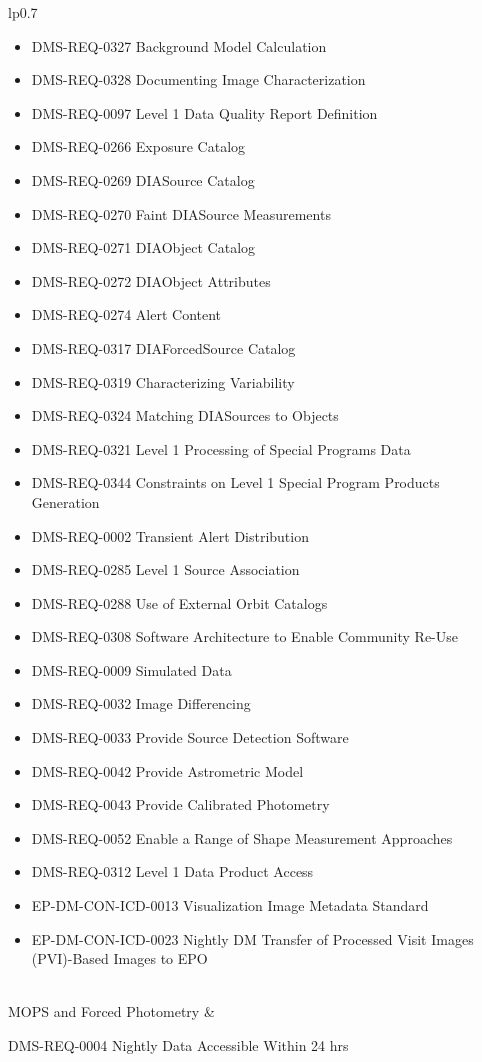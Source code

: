 \begin{xtabular}{lp{0.7\textwidth}}
\begin{itemize}
\item DMS-REQ-0327 Background Model Calculation
\item DMS-REQ-0328 Documenting Image Characterization
\item DMS-REQ-0097 Level 1 Data Quality Report Definition
\item DMS-REQ-0266 Exposure Catalog
\item DMS-REQ-0269 DIASource Catalog
\item DMS-REQ-0270 Faint DIASource Measurements
\item DMS-REQ-0271 DIAObject Catalog
\item DMS-REQ-0272 DIAObject Attributes
\item DMS-REQ-0274 Alert Content
\item DMS-REQ-0317 DIAForcedSource Catalog
\item DMS-REQ-0319 Characterizing Variability
\item DMS-REQ-0324 Matching DIASources to Objects
\item DMS-REQ-0321 Level 1 Processing of Special Programs Data
\item DMS-REQ-0344 Constraints on Level 1 Special Program Products Generation
\item DMS-REQ-0002 Transient Alert Distribution
\item DMS-REQ-0285 Level 1 Source Association
\item DMS-REQ-0288 Use of External Orbit Catalogs
\item DMS-REQ-0308 Software Architecture to Enable Community Re-Use
\item DMS-REQ-0009 Simulated Data
\item DMS-REQ-0032 Image Differencing
\item DMS-REQ-0033 Provide Source Detection Software
\item DMS-REQ-0042 Provide Astrometric Model
\item DMS-REQ-0043 Provide Calibrated Photometry
\item DMS-REQ-0052 Enable a Range of Shape Measurement Approaches
\item DMS-REQ-0312 Level 1 Data Product Access
\item EP-DM-CON-ICD-0013 Visualization Image Metadata Standard
\item EP-DM-CON-ICD-0023 Nightly DM Transfer of Processed Visit Images (PVI)-Based Images to EPO
\end{itemize} \\ \hline
MOPS and Forced Photometry &
\begin{itemize}DMS-REQ-0004 Nightly Data Accessible Within 24 hrs

\end{itemize}
\end{xtabular}

